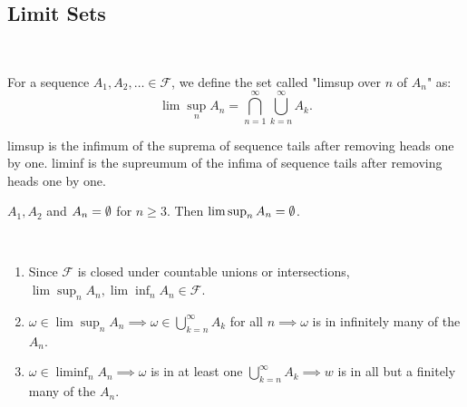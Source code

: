 \documentclass[class=article,crop=false]{standalone}
\begin{document}
\subsection{Limit Sets}
~\begin{defn}[limsup]
For a sequence $A_1,A_2,\ldots \in \mathcal{F}$, we define the set called "limsup over $n$ of $A_n$" as:
\[
\lim\sup_n A_n = \bigcap_{n= 1}^{\infty} \bigcup_{k=n}^{\infty} A_k.
\]
\end{defn}
\begin{intuition}
	limsup is the infimum of the suprema of sequence tails after removing heads one by one. liminf is the supreumum of the infima of sequence tails after removing heads one by one.
\end{intuition}
\begin{eg}[]
$A_1,A_2 $ and $A_n = \emptyset$ for $n \geq 3$. Then $\lim\sup_n A_n = \O$.
\end{eg}
\begin{note}[]
~\begin{enumerate}[label=\arabic*)]
	\item Since $\mathcal{F}$ is closed under countable unions or intersections, $\lim\sup_n A_n, \lim\inf_n A_n \in \mathcal{F} $.
	\item $\omega \in \lim\sup_n A_n \implies \omega \in \bigcup_{k=n}^{\infty} A_k$ for all $n \implies \omega$ is in infinitely many of the $A_n$.
	\item $\omega \in \liminf_n A_n \implies \omega$ is in at least one $\bigcup_{k=n}^{\infty} A_k \implies w$ is in all but a finitely many of the $A_n$.	
\end{enumerate}
\end{note}
\end{document}

